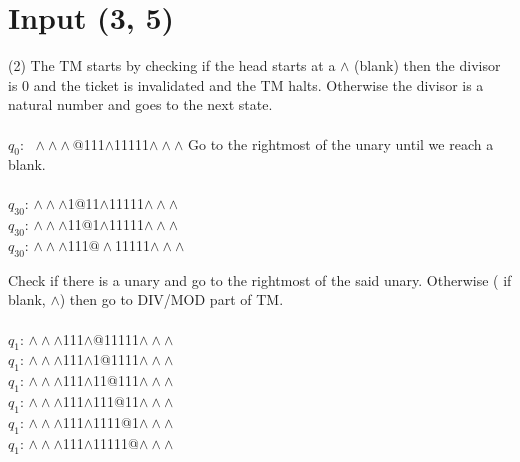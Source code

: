 \documentclass[a4paper]{article} %
\begin{document}
    \section{Input (3, 5)}
    \begin{center}
        \begin{varwidth}{\textwidth}
        \begin{tasks}[label={(\roman*)},label-width={0.5cm}] (2)
            \task
            The TM starts by checking if the head starts at a $\land$ (blank) then the divisor is 0 and the ticket is invalidated and the TM halts.
            Otherwise the divisor is a natural number and goes to the next state.\\\\
            $q_0$: $\;\land\land\land$@111$\land$11111$\land\land\land$
            \task
            Go to the rightmost of the unary until we reach a blank.\\\\
            $q_{30}$: $\land\land\land$1@11$\land$11111$\land\land\land$\\
            $q_{30}$: $\land\land\land$11@1$\land$11111$\land\land\land$\\
            $q_{30}$: $\land\land\land$111$@\land$11111$\land\land\land$ 

            \task
            Check if there is a unary and go to the rightmost of the said unary. Otherwise ( if blank, $\land$) then go to DIV/MOD part of TM.\\\\
            $q_1$: $\land\land\land$111$\land$@11111$\land\land\land$\\
            $q_1$: $\land\land\land$111$\land$1@1111$\land\land\land$\\
            $q_1$: $\land\land\land$111$\land$11@111$\land\land\land$\\
            $q_1$: $\land\land\land$111$\land$111@11$\land\land\land$\\
            $q_1$: $\land\land\land$111$\land$1111@1$\land\land\land$\\
            $q_1$: $\land\land\land$111$\land$11111@$\land\land\land$


\end{tasks}
\end{varwidth}
\end{center}
\end{document}
